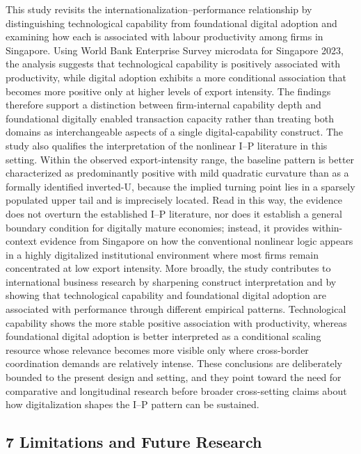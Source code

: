 \documentclass[12pt,a4paper]{article}
\begin{document}
This study revisits the internationalization--performance relationship
by distinguishing technological capability from foundational digital
adoption and examining how each is associated with labour productivity
among firms in Singapore. Using World Bank Enterprise Survey microdata
for Singapore 2023, the analysis suggests that technological capability
is positively associated with productivity, while digital adoption
exhibits a more conditional association that becomes more positive only
at higher levels of export intensity. The findings therefore support a
distinction between firm-internal capability depth and foundational
digitally enabled transaction capacity rather than treating both domains
as interchangeable aspects of a single digital-capability construct. The
study also qualifies the interpretation of the nonlinear I--P literature
in this setting. Within the observed export-intensity range, the
baseline pattern is better characterized as predominantly positive with
mild quadratic curvature than as a formally identified inverted-U,
because the implied turning point lies in a sparsely populated upper
tail and is imprecisely located. Read in this way, the evidence does not
overturn the established I--P literature, nor does it establish a
general boundary condition for digitally mature economies; instead, it
provides within-context evidence from Singapore on how the conventional
nonlinear logic appears in a highly digitalized institutional
environment where most firms remain concentrated at low export
intensity. More broadly, the study contributes to international business
research by sharpening construct interpretation and by showing that
technological capability and foundational digital adoption are
associated with performance through different empirical patterns.
Technological capability shows the more stable positive association with
productivity, whereas foundational digital adoption is better
interpreted as a conditional scaling resource whose relevance becomes
more visible only where cross-border coordination demands are relatively
intense. These conclusions are deliberately bounded to the present
design and setting, and they point toward the need for comparative and
longitudinal research before broader cross-setting claims about how
digitalization shapes the I--P pattern can be sustained.

\hypertarget{7-limitations-and-future-research}{%
\subsection{7 Limitations and Future
Research}\label{7-limitations-and-future-research}}
\end{document}
